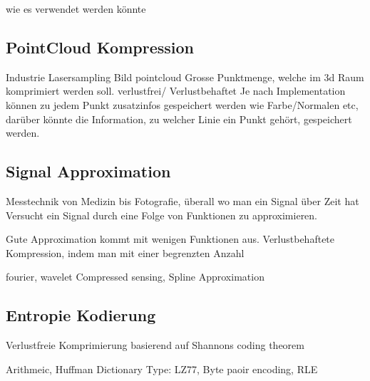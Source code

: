 wie es verwendet werden könnte

\subsection{PointCloud Kompression}
Industrie Lasersampling
Bild pointcloud
Grosse Punktmenge, welche im 3d Raum komprimiert werden soll.
verlustfrei/ Verlustbehaftet
Je nach Implementation können zu jedem Punkt zusatzinfos gespeichert werden wie Farbe/Normalen etc, darüber könnte die Information, zu welcher Linie ein Punkt gehört, gespeichert werden.

\subsection{Signal Approximation}
Messtechnik von Medizin bis Fotografie, überall wo man ein Signal über Zeit hat
Versucht ein Signal durch eine Folge von Funktionen zu approximieren.

Gute Approximation kommt mit wenigen Funktionen aus.
Verlustbehaftete Kompression, indem man mit einer begrenzten Anzahl

fourier, wavelet Compressed sensing, Spline Approximation

\subsection{Entropie Kodierung}
Verlustfreie Komprimierung basierend auf Shannons coding theorem

 Arithmeic, Huffman
Dictionary Type: LZ77, Byte paoir encoding, RLE
